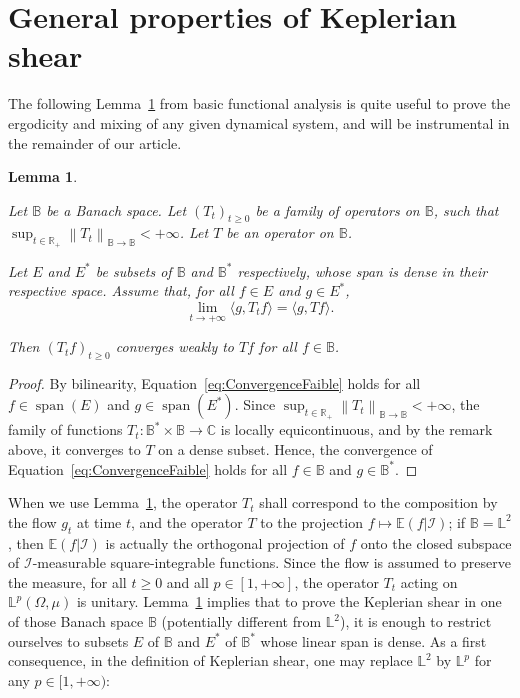\documentclass[10pt]{amsart}
\newtheorem{lemm}[theo]{Lemma}\newtheorem{prop}[theo]{Proposition}\newtheorem{coro}[theo]{Corollary}\newtheorem{conj}[theo]{Conjecture}
\theoremstyle{definition}\newtheorem{defi}[theo]{Definition}\newtheorem{rema}[theo]{Remark}\newtheorem{exam}[theo]{Example}\newtheorem{exem}[theo]{Example}\newtheorem{nota}[theo]{Notation}
\DeclareMathOperator{\VectSpan}{span}
\newcommand{\R}{\mathbb{R}}
\newcommand{\Cbb}{\mathbb{C}}
\newcommand{\B}{\mathbb{B}}
\newcommand{\Ebb}{\mathbb{E}}
\newcommand{\Lbb}{\mathbb{L}}
\newcommand{\Ical}{\mathcal{I}}
\newcommand{\norm}[2]{\left\| #1 \right\|_{#2}}
\begin{document}
\section{General properties of Keplerian shear}\label{sec:ProprietesFondamentales}

The following Lemma~\ref{lem:LemmeAnalyseFonctionnelle} from basic functional analysis is quite useful to prove the ergodicity and mixing of any given dynamical system, and will be instrumental in the remainder of our article.

\begin{lemm}\label{lem:LemmeAnalyseFonctionnelle}

Let $\B$ be a Banach space. Let $(T_t)_{t \geq 0}$ be a family of operators on $\B$, such that $\sup_{t \in \R_+} \norm{T_t}{\B \to \B} < + \infty$. Let $T$ be an operator on $\B$.

Let $E$ and $E^*$ be subsets of $\B$ and $\B^*$ respectively, whose span is dense in their respective space. Assume that, for all $f \in E$ and $g \in E^*$,
\begin{equation}\label{eq:ConvergenceFaible}
\lim_{t \to + \infty} \langle g, T_t f \rangle = \langle g, T f \rangle.
\end{equation}

Then $(T_t f)_{t \geq 0}$ converges weakly to $T f$ for all $f \in \B$.
\end{lemm}


\begin{proof}%
By bilinearity, Equation~\eqref{eq:ConvergenceFaible} holds for all $f \in \VectSpan(E)$ and $g \in \VectSpan(E^*)$.
Since $\sup_{t \in \R_+} \norm{T_t}{\B \to \B} < + \infty$, the family of functions $T_t : \B^* \times \B \to \Cbb$ is locally equicontinuous, and by the remark above, it converges to $T$ on a dense subset. Hence, the convergence of Equation~\eqref{eq:ConvergenceFaible} holds for all $f \in \B$ and $g \in \B^*$.
\end{proof}



When we use Lemma~\ref{lem:LemmeAnalyseFonctionnelle}, the operator $T_t$ shall correspond to the composition by the flow $g_t$ at time $t$, and the operator $T$ to the projection $f \mapsto \Ebb (f | \Ical)$; if $\B = \Lbb^2$, then $\Ebb (f | \Ical)$ is actually the orthogonal projection of $f$ onto the closed subspace of $\Ical$-measurable square-integrable functions. Since the flow is assumed to preserve the measure, for all $t \geq 0$ and all $p \in [1, + \infty]$, the operator $T_t$ acting on $\Lbb^p (\Omega, \mu)$ is unitary. Lemma~\ref{lem:LemmeAnalyseFonctionnelle} implies that to prove the Keplerian shear in one of those Banach space $\B$ (potentially different from $\Lbb^2$), it is enough to restrict ourselves to subsets $E$ of $\B$ and $E^*$ of $\B^*$ whose linear span is dense. As a first consequence, in the definition of Keplerian shear, one may replace $\Lbb^2$ by $\Lbb^p$ for any $p \in [1, +\infty)$:
\end{document}
